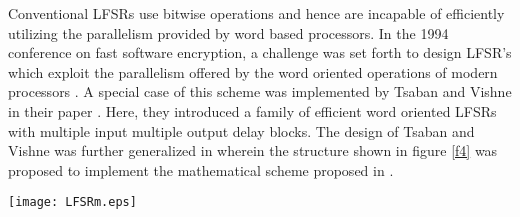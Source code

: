 \documentclass[letterpaper, 12 pt]{article}  \usepackage{amssymb}
\begin{document}
Conventional LFSRs use bitwise operations and hence are incapable of 
efficiently utilizing the parallelism provided by word based processors. In the
1994 conference on fast software encryption, a challenge was set
forth to design LFSR's which exploit the parallelism offered by the word
oriented operations of modern processors \cite{Preneel}.  A
special case of this scheme was implemented by Tsaban and Vishne
in their  paper \cite{Tsabman}. Here, they
introduced a family of efficient word oriented LFSRs with multiple input
multiple output delay blocks. 
The design of Tsaban and Vishne was further generalized in \cite{zeng} wherein
the structure shown in figure \ref{f4} was proposed to implement the
mathematical scheme proposed in \cite{Neider2}. 
\begin{figure*}[h]
     
\begin{center}
\texttt{[image: LFSRm.eps]}
 \caption{Linear Feedback Shift Register with m-Input m-Output Delay Blocks}
\label{f4}
\end{center}      
\end{figure*}
\end{document}

